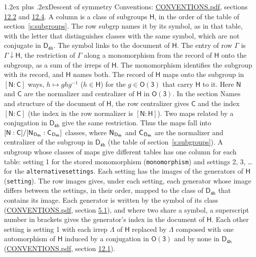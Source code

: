\documentclass[10pt,a4paper]{article}
\makeatletter
\renewcommand\section{\@startsection{section}{1}{\z@}{-3ex plus -1ex minus -.2ex}%
  {1.2ex plus .2ex}{\normalfont\large\sffamily\bfseries\color{parttitle}}}
\numberwithin{equation}{section}
\newcommand{\grp}[1]{\mathsf{#1}}
\newcommand{\grpindex}[2]{[#1 : #2]}
\newcommand{\restr}[2]{#1\!\downarrow#2}
\newcommand{\hairsp}{\mkern1mu}
\makeatother
\begin{document}
\section{Descent of symmetry}\label{s:subduction}
Conventions: \href{../../CONVENTIONS.pdf}{CONVENTIONS.pdf}, sections \href{../../CONVENTIONS.pdf\#conv.12.2}{12.2} and \href{../../CONVENTIONS.pdf\#conv.12.4}{12.4}.
A column is a class of subgroups $\grp{H}$, in the order of the table of section~\ref{s:subgroups}. The row subgrp names it by its symbol, as in that table, with the letter that distinguishes classes with the same symbol, which are not conjugate in $\grp{D_{4h}}$. The symbol links to the document of $\grp{H}$. The entry of row $\Gamma$ is $\restr{\Gamma}{\grp{H}}$, the restriction of $\Gamma$ along a monomorphism from the record of $\grp{H}$ onto the subgroup, as a sum of the irreps of $\grp{H}$. The monomorphism identifies the subgroup with its record, and $\grp{H}$ names both. \label{n:group.normalizer.o3}\label{n:group.centralizer.o3}The record of $\grp{H}$ maps onto the subgroup in $\grpindex{\grp{N}}{\grp{C}}$ ways, $h \mapsto g h g^{-1}$ ($h \in \grp{H}$) for the $g \in \grp{O(3)}$ that carry $\grp{H}$ to it. Here $\grp{N}$ and $\grp{C}$ are the normalizer and centralizer of $\grp{H}$ in \href{O3.pdf}{$\grp{O(3)}$}. In the section Names and structure of the document of $\grp{H}$, the row centralizer gives $\grp{C}$ and the index $\grpindex{\grp{N}}{\grp{C}}$ (the index in the row normalizer is $\grpindex{\grp{N}}{\grp{H}}$). Two maps related by a conjugation in $\grp{D_{4h}}$ give the same restriction. Thus the maps fall into $\grpindex{\grp{N}}{\grp{C}}/\grpindex{\grp{N}_{\hairsp \grp{D_{4h}}}}{\grp{C}_{\hairsp \grp{D_{4h}}}}$ classes, where $\grp{N}_{\hairsp \grp{D_{4h}}}$ and $\grp{C}_{\hairsp \grp{D_{4h}}}$ are the normalizer and centralizer of the subgroup in $\grp{D_{4h}}$ (the table of section~\ref{s:subgroups}). \label{n:head.setting}A subgroup whose classes of maps give different tables has one column for each table: setting 1 for the stored monomorphism (\texttt{monomorphism}) and settings 2, 3, \dots{} for the \texttt{alternativesettings}. Each setting has the images of the generators of $\grp{H}$ (\texttt{setting}). \label{n:head.images}The row images gives, under each setting, each generator whose image differs between the settings, in their order, mapped to the class of $\grp{D_{4h}}$ that contains its image. \label{n:element.generator.index}Each generator is written by the symbol of its class (\href{../../CONVENTIONS.pdf}{CONVENTIONS.pdf}, section \href{../../CONVENTIONS.pdf\#conv.5.1}{5.1}), and where two share a symbol, a superscript number in brackets gives the generator's index in the document of $\grp{H}$. \label{n:irrep.Delta}Each other setting is setting 1 with each irrep $\Lambda$ of $\grp{H}$ replaced by $\Lambda$ composed with one automorphism of $\grp{H}$ induced by a conjugation in \href{O3.pdf}{$\grp{O(3)}$} and by none in $\grp{D_{4h}}$ (\href{../../CONVENTIONS.pdf}{CONVENTIONS.pdf}, section \href{../../CONVENTIONS.pdf\#conv.12.1}{12.1}).
\end{document}
